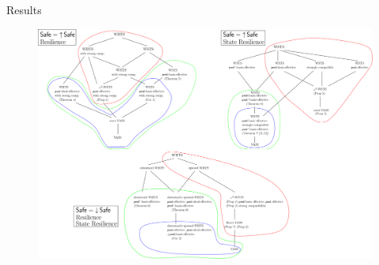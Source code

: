 \documentclass{beamer}
\begin{document}
    \begin{frame}{Results}
  
  
   \begin{center}
 	\begin{figure}
 	\vspace{-0.25cm}
\includegraphics[width=1.00\textwidth]{All_results}
	\end{figure}
\end{center}  
    
    
          \end{frame}
\end{document}
